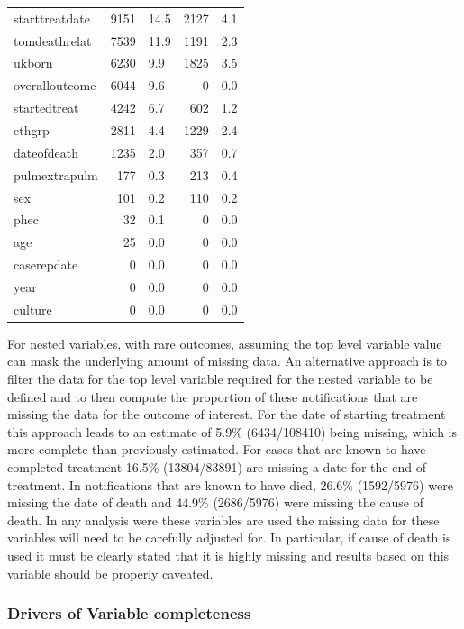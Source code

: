 \documentclass[11pt,twoside]{bristolthesis}
\begin{document}
\begin{table}[H]
\begin{tabular}{lrlrl}
  starttreatdate & 9151 & 14.5 & 2127 & 4.1\\
  tomdeathrelat & 7539 & 11.9 & 1191 & 2.3\\
  ukborn & 6230 & 9.9 & 1825 & 3.5\\
  overalloutcome & 6044 & 9.6 & 0 & 0.0\\
  \addlinespace
  startedtreat & 4242 & 6.7 & 602 & 1.2\\
  ethgrp & 2811 & 4.4 & 1229 & 2.4\\
  dateofdeath & 1235 & 2.0 & 357 & 0.7\\
  pulmextrapulm & 177 & 0.3 & 213 & 0.4\\
  sex & 101 & 0.2 & 110 & 0.2\\
  \addlinespace
  phec & 32 & 0.1 & 0 & 0.0\\
  age & 25 & 0.0 & 0 & 0.0\\
  caserepdate & 0 & 0.0 & 0 & 0.0\\
  year & 0 & 0.0 & 0 & 0.0\\
  culture & 0 & 0.0 & 0 & 0.0\\
  \bottomrule
  \end{tabular}
  \end{table}
  For nested variables, with rare outcomes, assuming the top level variable value can mask the underlying amount of missing data. An alternative approach is to filter the data for the top level variable required for the nested variable to be defined and to then compute the proportion of these notifications that are missing the data for the outcome of interest. For the date of starting treatment this approach leads to an estimate of 5.9\% (6434/108410) being missing, which is more complete than previously estimated. For cases that are known to have completed treatment 16.5\% (13804/83891) are missing a date for the end of treatment. In notifications that are known to have died, 26.6\% (1592/5976) were missing the date of death and 44.9\% (2686/5976) were missing the cause of death. In any analysis were these variables are used the missing data for these variables will need to be carefully adjusted for. In particular, if cause of death is used it must be clearly stated that it is highly missing and results based on this variable should be properly caveated.
  
  \hypertarget{drivers-of-variable-completeness}{%
  \subsubsection{Drivers of Variable completeness}\label{drivers-of-variable-completeness}}
  
\end{document}
